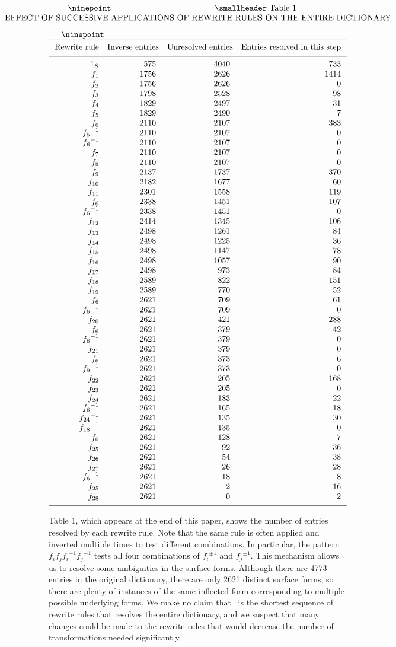 \midinsert
\vskip-10pt
$$\vcenter{\vbox{
\ninepoint
\centerline{\smallheader Table 1}
\medskip
\centerline{EFFECT OF SUCCESSIVE APPLICATIONS OF REWRITE RULES ON THE ENTIRE DICTIONARY}
}}$$
\vskip-5pt
$$\vcenter{\vbox{
\ninepoint
\hrule
\medskip
\tabskip=.7em plus.2em minus .5em
\halign{
   $\hfil#$   &  \hfil# & \hfil# & \hfil#\cr
   \hbox{Rewrite rule}\hfil&Inverse entries\hfil & Unresolved entries\hfil & Entries resolved in this step\hfil\cr
   \noalign{\medskip}
   \noalign{\hrule}
   \noalign{\medskip}
   1_S & 575 & 4040 & 733\cr
   f_1 & 1756 & 2626 & 1414\cr
   f_2 & 1756 & 2626 & 0\cr
   f_3 & 1798 & 2528 & 98\cr
   f_4 & 1829 & 2497 & 31\cr
   f_5 & 1829 & 2490 & 7\cr
   f_6 & 2110 & 2107 & 383\cr
   {f_5}^{-1} & 2110 & 2107 & 0\cr
   {f_6}^{-1} & 2110 & 2107 & 0\cr
   f_7 & 2110 & 2107 & 0\cr
   f_8 & 2110 & 2107 & 0\cr
   f_9 & 2137 & 1737 & 370\cr
   f_{10} & 2182 & 1677 & 60\cr
   f_{11} & 2301 & 1558 & 119\cr
   f_6 & 2338 & 1451 & 107\cr
   {f_6}^{-1} & 2338 & 1451 & 0\cr
   f_{12} & 2414 & 1345 & 106\cr
   f_{13} & 2498 & 1261 & 84\cr
   f_{14} & 2498 & 1225 & 36\cr
   f_{15} & 2498 & 1147 & 78\cr
   f_{16} & 2498 & 1057 & 90\cr
   f_{17} & 2498 & 973 & 84\cr
   f_{18} & 2589 & 822 & 151\cr
   f_{19} & 2589 & 770 & 52\cr
   f_6 & 2621 & 709 & 61\cr
   {f_6}^{-1} & 2621 & 709 & 0\cr
   f_{20} & 2621 & 421 & 288\cr
   f_6 & 2621 & 379 & 42\cr
   {f_6}^{-1} & 2621 & 379 & 0\cr
   f_{21} & 2621 & 379 & 0\cr
   f_6 & 2621 & 373 & 6\cr
   {f_9}^{-1} & 2621 & 373 & 0\cr
   f_{22} & 2621 & 205 & 168\cr
   f_{23} & 2621 & 205 & 0\cr
   f_{24} & 2621 & 183 & 22\cr
   {f_6}^{-1} & 2621 & 165 & 18\cr
   {f_{24}}^{-1} & 2621 & 135 & 30\cr
   {f_{18}}^{-1} & 2621 & 135 & 0\cr
   f_6 & 2621 & 128 & 7\cr
   f_{25} & 2621 & 92 & 36\cr
   f_{26} & 2621 & 54 & 38\cr
   f_{27} & 2621 & 26 & 28\cr
   {f_6}^{-1} & 2621 & 18 & 8\cr
   f_{25} & 2621 & 2 & 16\cr
   f_{28} & 2621 & 0 & 2\cr
 \noalign{\medskip}
 \noalign{\hrule}
    }
}}$$
\endinsert

Table 1, which appears at the end of this paper,
shows the number of entries resolved by each rewrite rule. Note that the same rule is often
applied and inverted multiple times to test different combinations. In particular, the pattern
$f_i f_j {f_i}^{-1} {f_j}^{-1}$ tests all four combinations of ${f_i}^{\pm 1}$ and ${f_j}^{\pm 1}$. This
mechanism allows us to resolve some ambiguities in the surface forms.
Although there are 4773 entries in the original
dictionary, there are only 2621 distinct surface forms, so there are plenty of instances of the same
inflected form corresponding to multiple possible underlying forms. We make no claim that~
is the shortest sequence of rewrite rules that resolves the entire dictionary, and we suspect that many
changes could be made to the rewrite rules that would decrease the number of transformations needed significantly.

